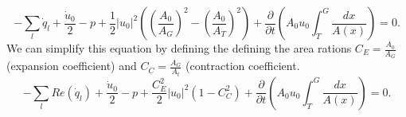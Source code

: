 \documentclass[superscriptaddress, onecolumn, prl]{revtex4}
\begin{document}
\begin{equation}
\label{eq:energy4}
-\sum_l{\dot{q}_l} + \frac{\dot{u}_0}{2} - p + \frac{1}{2} |u_{0}|^2 \left( \left( \frac{A_{0}}{A_{G}} \right)^2- \left( \frac{A_{0}}{A_{T}} \right)^2 \right) + \frac{\partial}{\partial t} \left( A_{0} u_{0} \int_{T}^{G} \frac{dx}{A(x)} \right) = 0.
\end{equation}
We can simplify this equation by defining the defining the area rations $C_E = \frac{A_{0}}{A_{G}}$ (expansion coefficient) and $C_C = \frac{A_G}{A_t}$ (contraction coefficient.
\begin{equation}
\label{eq:energy5}
-\sum_l{Re(\dot{q}_l)} + \frac{\dot{u}_0}{2} - p + \frac{C_E^2}{2} |u_{0}|^2 \left( 1 - C_C^2 \right) + \frac{\partial}{\partial t} \left( A_{0} u_{0} \int_{T}^{G} \frac{dx}{A(x)} \right) = 0.
\end{equation}
\end{document}
